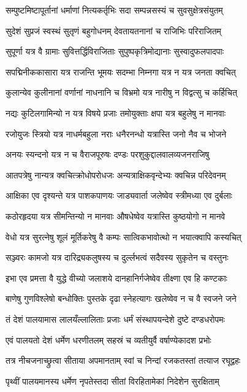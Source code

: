 \twolineshloka
{सम्पुष्टमिष्टापूर्तानां धर्माणां नित्यकर्तृभिः}
{सदा सम्पन्नसस्यं च सुवसुक्षेत्रसंयुतम्}%

\twolineshloka
{सुदेशं सुप्रजं स्वस्थं सुतृणं बहुगोधनम्}
{देवतायतनानां च राजिभिः परिराजितम्}%

\twolineshloka
{सुपूर्णा यत्र वै ग्रामाः सुवित्तर्द्धिविराजिताः}
{सुपुष्पकृत्रिमोद्यानाः सुस्वादुफलपादपाः}%

\twolineshloka
{सपद्मिनीककासारा यत्र राजन्ति भूमयः}
{सदम्भा निम्नगा यत्र न यत्र जनता क्वचित्}%

\twolineshloka
{कुलान्येव कुलीनानां वर्णानां नाधनानि च}
{विभ्रमो यत्र नारीषु न विद्वत्सु च कर्हिचित्}%

\twolineshloka
{नद्यः कुटिलगामिन्यो न यत्र विषये प्रजाः}
{तमोयुक्ताः क्षपा यत्र बहुलेषु न मानवाः}%

\twolineshloka
{रजोयुजः स्त्रियो यत्र नाधर्मबहुला नराः}
{धनैरनन्धो यत्रास्ति जनो नैव च भोजने}%

\twolineshloka
{अनयः स्यन्दनो यत्र न च वैराजपूरुषः}
{दण्डः परशुकुद्दालवालव्यजनराजिषु}%

\twolineshloka
{आतपत्रेषु नान्यत्र क्वचित्क्रोधोपरोधजः}
{अन्यत्राक्षिकवृन्देभ्यः क्वचिन्न परिदेवनम्}%

\twolineshloka
{आक्षिका एव दृश्यन्ते यत्र पाशकपाणयः}
{जाड्यवार्ता जलेष्वेव स्त्रीमध्या एव दुर्बलाः}%

\twolineshloka
{कठोरहृदया यत्र सीमन्तिन्यो न मानवाः}
{औषधेष्वेव यत्रास्ति कुष्ठयोगो न मानवे}%

\twolineshloka
{वेधो यत्र सुरत्नेषु शूलं मूर्तिकरेषु वै}
{कम्पः सात्विकभावोत्थो न भयात्क्वापि कस्यचित्}%

\twolineshloka
{सञ्ज्वरः कामजो यत्र दारिद्र्यकलुषस्य च}
{दुर्ल्लभत्वं सदैवस्य सुकृतेन च वस्तुनः}%

\twolineshloka
{इभा एव प्रमत्ता वै युद्धे वीच्यो जलाशये}
{दानहानिर्गजेष्वेव तीक्ष्णा एव हि कण्टकाः}%

\twolineshloka
{बाणेषु गुणविश्लेषो बन्धोक्तिः पुस्तके दृढा}
{स्नेहत्यागः खलेष्वेव न च वै स्वजने जने}%

\twolineshloka
{तं देशं पालयामास लालयँल्लालिताः प्रजाः}
{धर्मं संस्थापयन्देशे दुष्टे दण्डधरोपमः}%

\twolineshloka
{एवं पालयतो देशं धर्मेण धरणीतलम्}
{सहस्रं च व्यतीयुर्वै वर्षाण्येकादश प्रभोः}%

\twolineshloka
{तत्र नीचजनाच्छ्रुत्वा सीताया अपमानताम्}
{स्वां च निन्दां रजकतस्तां तत्याज रघूद्वहः}%

\twolineshloka
{पृथ्वीं पालयमानस्य धर्मेण नृपतेस्तदा}
{सीतां विरहितामेकां निदेशेन सुरक्षिताम्}%

